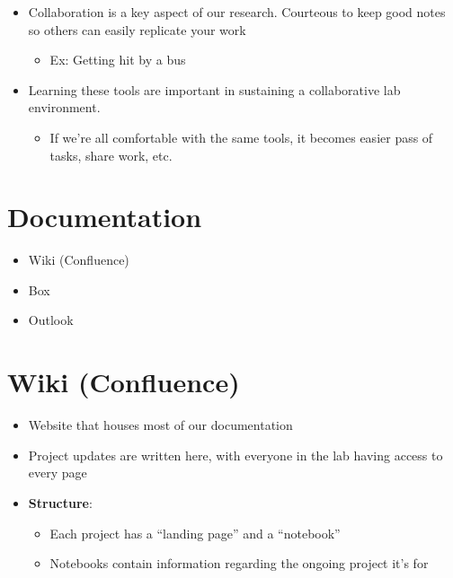 \documentclass[
  letterpaper,
  DIV=11,
  numbers=noendperiod]{scrartcl}
\providecommand{\tightlist}{%
  \setlength{\itemsep}{0pt}\setlength{\parskip}{0pt}}\usepackage{longtable,booktabs,array}
\begin{document}
\begin{itemize}
\tightlist
\item
  Collaboration is a key aspect of our research. Courteous to keep good
  notes so others can easily replicate your work

  \begin{itemize}
  \tightlist
  \item
    {Ex}: Getting hit by a bus
  \end{itemize}
\end{itemize}

\begin{itemize}
\tightlist
\item
  Learning these tools are important in sustaining a collaborative lab
  environment.

  \begin{itemize}
  \tightlist
  \item
    If we're all comfortable with the same tools, it becomes easier pass
    of tasks, share work, etc.
  \end{itemize}
\end{itemize}

\section{Documentation}\label{documentation}

\begin{itemize}
\item
  Wiki (Confluence)
\item
  Box
\item
  Outlook
\end{itemize}

\section{Wiki (Confluence)}\label{wiki}

\begin{itemize}
\item
  Website that houses most of our documentation
\item
  Project updates are written here, with everyone in the lab having
  access to every page
\item
  \textbf{{Structure}}:

  \begin{itemize}
  \tightlist
  \item
    Each project has a ``landing page'' and a ``notebook''
  \item
    Notebooks contain information regarding the ongoing project it's for
  \end{itemize}
\end{itemize}
\end{document}
